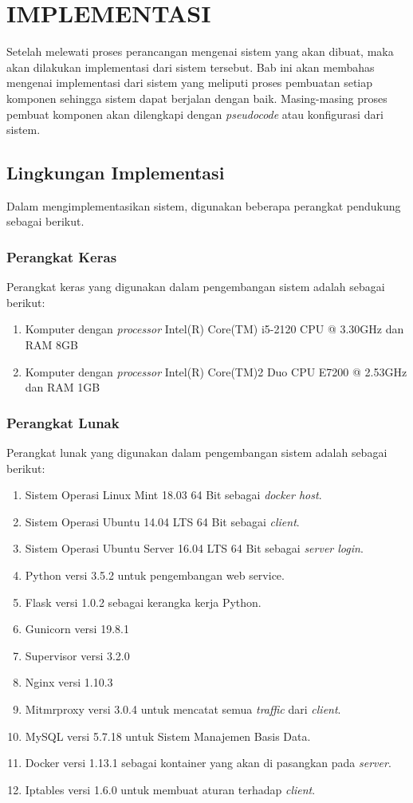 \chapter{IMPLEMENTASI}
Setelah melewati proses perancangan mengenai sistem yang akan dibuat, maka akan dilakukan implementasi dari sistem tersebut. Bab ini akan membahas mengenai implementasi dari sistem yang meliputi proses pembuatan setiap komponen sehingga sistem dapat berjalan dengan baik. Masing-masing proses pembuat komponen akan dilengkapi dengan \textit{pseudocode} atau konfigurasi dari sistem.  
\section{Lingkungan Implementasi}
Dalam mengimplementasikan sistem, digunakan beberapa perangkat pendukung sebagai berikut.
\subsection{Perangkat Keras}
Perangkat keras yang digunakan dalam pengembangan sistem adalah sebagai berikut:
\begin{enumerate}
	\item Komputer dengan \textit{processor} Intel(R) Core(TM) i5-2120 CPU @ 3.30GHz dan RAM 8GB
	\item Komputer dengan \textit{processor} Intel(R) Core(TM)2 Duo CPU E7200 @ 2.53GHz dan RAM 1GB
\end{enumerate}
\subsection{Perangkat Lunak}
Perangkat lunak yang digunakan dalam pengembangan sistem adalah sebagai berikut:
\begin{enumerate}
	\item Sistem Operasi Linux Mint 18.03 64 Bit sebagai \textit{docker host}.
	\item Sistem Operasi Ubuntu 14.04 LTS 64 Bit sebagai \textit{client}.
	\item Sistem Operasi Ubuntu Server 16.04 LTS 64 Bit sebagai \textit{server login}.
	\item Python versi 3.5.2 untuk pengembangan web service. 
	\item Flask versi 1.0.2 sebagai kerangka kerja Python.
	\item Gunicorn versi 19.8.1
	\item Supervisor versi 3.2.0
	\item Nginx versi 1.10.3
	\item Mitmrproxy versi 3.0.4 untuk mencatat semua \textit{traffic} dari \textit{client}.
	\item MySQL versi 5.7.18 untuk Sistem Manajemen Basis Data.
	\item Docker versi 1.13.1 sebagai kontainer yang akan di pasangkan pada \textit{server}.
	\item Iptables versi 1.6.0 untuk membuat aturan terhadap \textit{client}.
\end{enumerate}

